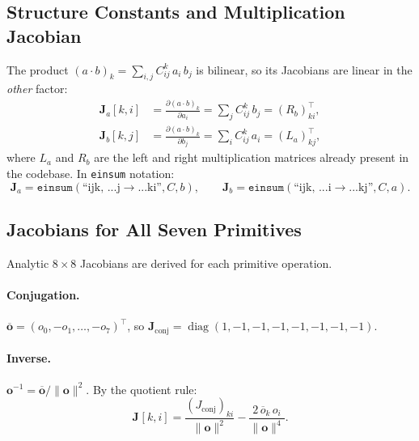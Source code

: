 \documentclass[11pt]{article}
\newcommand{\conj}[1]{\overline{#1}}
\newcommand{\norm}[1]{\lVert #1 \rVert}
\newcommand{\Jac}[2]{\mathbf{J}_{#1}[#2]}
\newcommand{\Lmat}[1]{L_{#1}}
\newcommand{\Rmat}[1]{R_{#1}}
\newcommand{\pd}[2]{\frac{\partial #1}{\partial #2}}
\begin{document}
\subsection{Structure Constants and Multiplication Jacobian}

The product $(a \cdot b)_k = \sum_{i,j} C_{ij}^k\,a_i\,b_j$ is bilinear, so
its Jacobians are linear in the \emph{other} factor:
\begin{align}
  \Jac{a}{k,i}
  &= \pd{(a\cdot b)_k}{a_i}
   = \sum_j C_{ij}^k\,b_j
   = (\Rmat{b})^\top_{ki},\label{eq:J-a}\\[4pt]
  \Jac{b}{k,j}
  &= \pd{(a\cdot b)_k}{b_j}
   = \sum_i C_{ij}^k\,a_i
   = (\Lmat{a})^\top_{kj},\label{eq:J-b}
\end{align}
where $\Lmat{a}$ and $\Rmat{b}$ are the left and right multiplication matrices
already present in the codebase.  In \texttt{einsum} notation:
\begin{equation}
  \mathbf{J}_a = \texttt{einsum}(\text{``ijk, ...j} \to \text{...ki''}, C, b),\qquad
  \mathbf{J}_b = \texttt{einsum}(\text{``ijk, ...i} \to \text{...kj''}, C, a).
\end{equation}

\subsection{Jacobians for All Seven Primitives}

Analytic $8\times 8$ Jacobians are derived for each primitive operation.

\paragraph{Conjugation.}
$\conj{\mathbf{o}} = (o_0, -o_1, \ldots, -o_7)^\top$, so
$\mathbf{J}_{\text{conj}} = \operatorname{diag}(1,-1,-1,-1,-1,-1,-1,-1)$.

\paragraph{Inverse.}
$\mathbf{o}^{-1} = \conj{\mathbf{o}}/\norm{\mathbf{o}}^2$.  By the quotient rule:
\begin{equation}
  \Jac{}{k,i}
  = \frac{(J_\text{conj})_{ki}}{\norm{\mathbf{o}}^2}
  - \frac{2\,\conj{o}_k\,o_i}{\norm{\mathbf{o}}^4}.
\end{equation}
\end{document}
